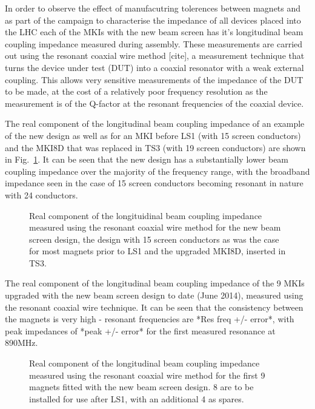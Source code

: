 \documentclass[a4paper,
              ]{jacow}
\begin{document}
In order to observe the effect of manufacutring tolerences between magnets and as part of the campaign to characterise the impedance of all devices placed into the LHC each of the MKIs with the new beam screen has it's longitudinal beam coupling impedance measured during assembly. These measurements are carried out using the resonant coaxial wire method [cite], a measurement technique that turns the device under test (DUT) into a coaxial resonator with a weak external coupling. This allows very sensitive measurements of the impedance of the DUT to be made, at the cost of a relatively poor frequency resolution as the measurement is of the Q-factor at the resonant frequencies of the coaxial device.

The real component of the longitudinal beam coupling impedance of an example of the new design as well as for an MKI before LS1 (with 15 screen conductors) and the MKI8D that was replaced in TS3 (with 19 screen conductors) are shown in Fig.~\ref{fig:Imp241915}. It can be seen that the new design has a substantially lower beam coupling impedance over the majority of the frequency range, with the broadband impedance seen in the case of 15 screen conductors becoming resonant in nature with 24 conductors.

\begin{figure}
\caption{Real component of the longituidinal beam coupling impedance measured using the resonant coaxial wire method for the new beam screen design, the design with 15 screen conductors as was the case for most magnets prior to LS1 and the upgraded MKI8D, inserted in TS3.}
\label{fig:Imp241915}
\end{figure}

The real component of the longitudinal beam coupling impedance of the 9 MKIs upgraded with the new beam screen design to date (June 2014), measured using the resonant coaxial wire technique. It can be seen that the consistency between the magnets is very high - resonant frequencies are *Res freq +/- error*, with peak impedances of *peak +/- error* for the first measured resonance at 890MHz. 

\begin{figure}
\caption{Real component of the longitudinal beam coupling impedance measured using the resonant coaxial wire method for the first 9 magnets fitted with the new beam screen design. 8 are to be installed for use after LS1, with an additional 4 as spares.}
\label{fig:allNewMKIImp}
\end{figure}
\end{document}
